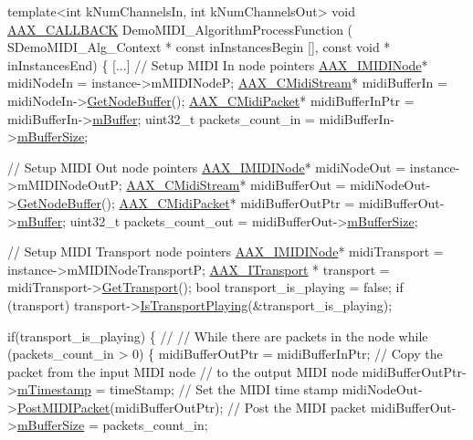 \begin{DoxyCode}
\textcolor{keyword}{template}<\textcolor{keywordtype}{int} kNumChannelsIn, \textcolor{keywordtype}{int} kNumChannelsOut> 
\textcolor{keywordtype}{void}
\hyperlink{a00149_aaa22112139aa627574b1ef562f579d43}{AAX\_CALLBACK}
DemoMIDI\_AlgorithmProcessFunction (
                                   SDemoMIDI\_Alg\_Context * \textcolor{keyword}{const}    inInstancesBegin [],
                                   \textcolor{keyword}{const} \textcolor{keywordtype}{void} *                 inInstancesEnd)
\{
    [...]
    \textcolor{comment}{// Setup MIDI In node pointers }
    \hyperlink{a00105}{AAX\_IMIDINode}* midiNodeIn = instance->mMIDINodeP;
    \hyperlink{a00025}{AAX\_CMidiStream}* midiBufferIn = midiNodeIn->\hyperlink{a00105_a794f1c0d19ac6720382c23b0a4dc2b17}{GetNodeBuffer}();
    \hyperlink{a00024}{AAX\_CMidiPacket}* midiBufferInPtr = midiBufferIn->\hyperlink{a00025_a5011ea886dce57b382c23b82e56d3000}{mBuffer};
    uint32\_t packets\_count\_in = midiBufferIn->\hyperlink{a00025_ad93c962a8278977f2a4f07b1e7490a90}{mBufferSize};
    
    \textcolor{comment}{// Setup MIDI Out node pointers }
    \hyperlink{a00105}{AAX\_IMIDINode}* midiNodeOut = instance->mMIDINodeOutP;
    \hyperlink{a00025}{AAX\_CMidiStream}* midiBufferOut = midiNodeOut->\hyperlink{a00105_a794f1c0d19ac6720382c23b0a4dc2b17}{GetNodeBuffer}();
    \hyperlink{a00024}{AAX\_CMidiPacket}* midiBufferOutPtr = midiBufferOut->\hyperlink{a00025_a5011ea886dce57b382c23b82e56d3000}{mBuffer};
    uint32\_t packets\_count\_out = midiBufferOut->\hyperlink{a00025_ad93c962a8278977f2a4f07b1e7490a90}{mBufferSize};

    
    \textcolor{comment}{// Setup MIDI Transport node pointers }
    \hyperlink{a00105}{AAX\_IMIDINode}* midiTransport = instance->mMIDINodeTransportP;
    \hyperlink{a00116}{AAX\_ITransport} * transport = midiTransport->\hyperlink{a00105_a57bd132ee74047e25298b157c0bff2f9}{GetTransport}();
    \textcolor{keywordtype}{bool} transport\_is\_playing = \textcolor{keyword}{false};
    \textcolor{keywordflow}{if} (transport)
        transport->\hyperlink{a00116_a8f7d5b8f65ff9dd456a395838c974715}{IsTransportPlaying}(&transport\_is\_playing);
    
    \textcolor{keywordflow}{if}(transport\_is\_playing)
    \{
        \textcolor{comment}{//}
        \textcolor{comment}{// While there are packets in the node}
        \textcolor{keywordflow}{while} (packets\_count\_in > 0)
        \{
            midiBufferOutPtr = midiBufferInPtr;         \textcolor{comment}{// Copy the packet from the input MIDI node }
                                        \textcolor{comment}{// to the output MIDI node}
            midiBufferOutPtr->\hyperlink{a00024_a76df0e71968aa1416b93015ebf23ddc5}{mTimestamp} = timeStamp;     \textcolor{comment}{// Set the MIDI time stamp}
            midiNodeOut->\hyperlink{a00105_a5e1c5409158164f57376f908c9693a8b}{PostMIDIPacket}(midiBufferOutPtr);    \textcolor{comment}{// Post the MIDI packet}
            midiBufferOut->\hyperlink{a00025_ad93c962a8278977f2a4f07b1e7490a90}{mBufferSize} = packets\_count\_in;   
                            

\end{DoxyCode}
